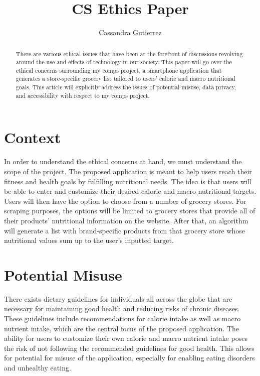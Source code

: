 \documentclass[10pt,twocolumn]{article}
\title{CS Ethics Paper}
\author{Cassandra Gutierrez}
\affiliation{Occidental College}
\begin{document}
\maketitle

\begin{abstract}
There are various ethical issues that have been at the forefront of discussions revolving around the use and effects of technology in our society. This paper will go over the ethical concerns surrounding my comps project, a smartphone application that generates a store-specific grocery list tailored to users’ calorie and macro nutritional goals. This article will explicitly address the issues of potential misuse, data privacy, and accessibility with respect to my comps project.
\end{abstract}

\section{Context}
In order to understand the ethical concerns at hand, we must understand the scope of the project. The proposed application is meant to help users reach their fitness and health goals by fulfilling nutritional needs. The idea is that users will be able to enter and customize their desired caloric and macro nutritional targets. Users will then have the option to choose from a number of grocery stores. For scraping purposes, the options will be limited to grocery stores that provide all of their products’ nutritional information on the website. After that, an algorithm will generate a list with brand-specific products from that grocery store whose nutritional values sum up to the user’s inputted target.

\section{Potential Misuse}
There exists dietary guidelines for individuals all across the globe that are necessary for maintaining good health and reducing risks of chronic diseases. These guidelines include recommendations for calorie intake as well as macro nutrient intake, which are the central focus of the proposed application. The ability for users to customize their own calorie and macro nutrient intake poses the risk of not following the recommended guidelines for good health. This allows for potential for misuse of the application, especially for enabling eating disorders and unhealthy eating.
\end{document}
